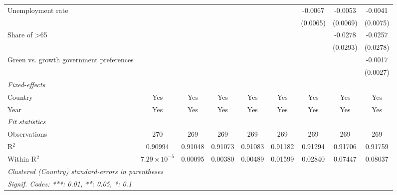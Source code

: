 \begin{table}[htbp]
\begin{tabular}{lcccccccc}
      Unemployment rate                                                  &                       &          &          &          &          & -0.0067  & -0.0053  & -0.0041\\   
                                                                         &                       &          &          &          &          & (0.0065) & (0.0069) & (0.0075)\\   
      Share of >65                                                       &                       &          &          &          &          &          & -0.0278  & -0.0257\\   
                                                                         &                       &          &          &          &          &          & (0.0293) & (0.0278)\\   
      Green vs. growth government preferences                            &                       &          &          &          &          &          &          & -0.0017\\   
                                                                         &                       &          &          &          &          &          &          & (0.0027)\\   
      \midrule
      \emph{Fixed-effects}\\
      Country                                                            & Yes                   & Yes      & Yes      & Yes      & Yes      & Yes      & Yes      & Yes\\  
      Year                                                               & Yes                   & Yes      & Yes      & Yes      & Yes      & Yes      & Yes      & Yes\\  
      \midrule
      \emph{Fit statistics}\\
      Observations                                                       & 270                   & 269      & 269      & 269      & 269      & 269      & 269      & 269\\  
      R$^2$                                                              & 0.90994               & 0.91048  & 0.91073  & 0.91083  & 0.91182  & 0.91294  & 0.91706  & 0.91759\\  
      Within R$^2$                                                       & $7.29\times 10^{-5}$  & 0.00095  & 0.00380  & 0.00489  & 0.01599  & 0.02840  & 0.07447  & 0.08037\\  
      \midrule \midrule
      \multicolumn{9}{l}{\emph{Clustered (Country) standard-errors in parentheses}}\\
      \multicolumn{9}{l}{\emph{Signif. Codes: ***: 0.01, **: 0.05, *: 0.1}}\\
   \end{tabular}
\end{table}



